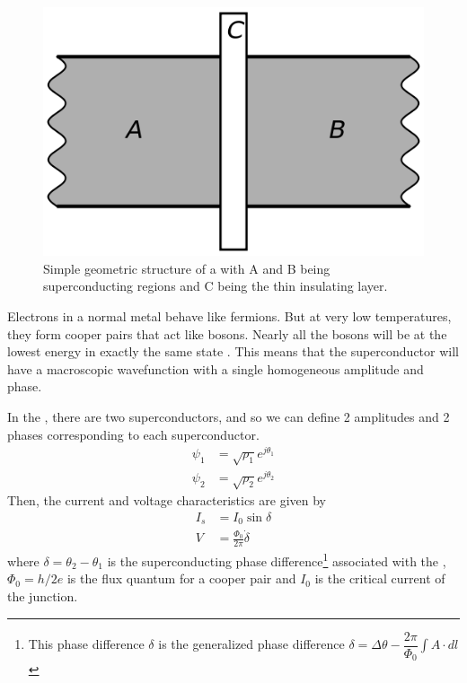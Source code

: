 \begin{figure}
\centering
\includegraphics[width=\linewidth]{Figures/SISJJ}
\decoRule
\caption[Josephson Junction]{Simple geometric structure of a \JJ with A and B being superconducting regions and C being the thin insulating layer.}
\label{fig:SISJJ}
\end{figure}

Electrons in a normal metal behave like fermions. But at very low temperatures, they form cooper pairs that act like bosons. Nearly all the bosons will be at the lowest energy in exactly the same state \cite{Feynman1966}. This means that the superconductor will have a macroscopic wavefunction with a single homogeneous amplitude and phase.

In the \JJ, there are two superconductors, and so we can define 2 amplitudes and 2 phases corresponding to each superconductor.
\begin{align*}
\psi_1&=\sqrt{\rho_1}e^{j\theta_1}\\
\psi_2&=\sqrt{\rho_2}e^{j\theta_2}
\end{align*}
Then, the current and voltage characteristics are given by \cite{Harmans1997}
\begin{align}
I_s&=I_0\sin\delta
\label{eqn:JJ current}\\
V&=\frac{\Phi_0}{2\pi}\dot{\delta}
\label{eqn:JJ voltage}
\end{align}
where $\delta=\theta_2-\theta_1$ is the superconducting phase difference\footnote{This phase difference $\delta$ is the generalized phase difference $\delta=\Delta\theta-\displaystyle\dfrac{2\pi}{\Phi_0}\int A\cdot dl$} associated with the \JJ, $\Phi_0=h/2e$ is the flux quantum for a cooper pair and $I_0$ is the critical current of the junction.

